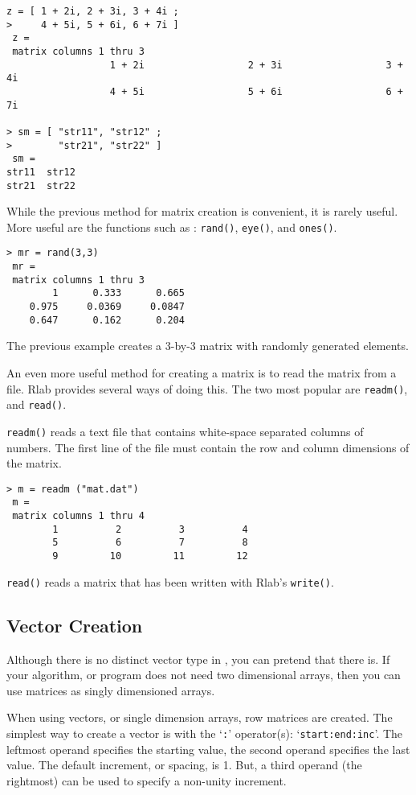 \begin{verbatim}
z = [ 1 + 2i, 2 + 3i, 3 + 4i ;
>     4 + 5i, 5 + 6i, 6 + 7i ]
 z =
 matrix columns 1 thru 3
                  1 + 2i                  2 + 3i                  3 + 4i
                  4 + 5i                  5 + 6i                  6 + 7i

> sm = [ "str11", "str12" ;
>        "str21", "str22" ]
 sm =
str11  str12  
str21  str22  
\end{verbatim}

   While the previous method for matrix creation is convenient, it is
   rarely useful. More useful are the functions such as :
   \verb+rand()+, \verb+eye()+, and \verb+ones()+.

\begin{verbatim}
> mr = rand(3,3)
 mr =
 matrix columns 1 thru 3
        1      0.333      0.665  
    0.975     0.0369     0.0847  
    0.647      0.162      0.204  
\end{verbatim}

   The previous example creates a 3-by-3 matrix with randomly
   generated elements.

   An even more useful method for creating a matrix is to read the
   matrix from a file. Rlab provides several ways of doing this. The
   two most popular are \verb+readm()+, and \verb+read()+.

   \verb+readm()+ reads a text file that contains white-space
   separated columns of numbers. The first line of the file must
   contain the row and column dimensions of the matrix.

\begin{verbatim}
> m = readm ("mat.dat")
 m =
 matrix columns 1 thru 4
        1          2          3          4  
        5          6          7          8  
        9         10         11         12  
\end{verbatim}

   \verb+read()+ reads a matrix that has been written with Rlab's
   \verb+write()+. 

\subsection{Vector Creation}

   Although there is no distinct vector type in \RLaB , you can
   pretend that there is. If your algorithm, or program does not need
   two dimensional arrays, then you can use matrices as singly
   dimensioned arrays.

   When using vectors, or single dimension arrays, row matrices are
   created. The simplest way to create a vector is with the `\verb+:+'
   operator(s): `\verb+start:end:inc+'. The leftmost operand specifies
   the starting value, the second operand specifies the last value.
   The default increment, or spacing, is 1. But, a third operand (the
   rightmost) can be used to specify a non-unity increment.

